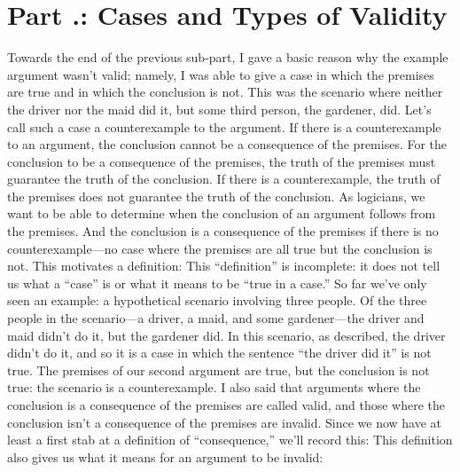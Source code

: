 \section{Part \thechapcount.\theseccount: Cases and Types of Validity}
Towards the end of the previous sub-part, I gave a basic reason why the example argument wasn't valid; namely, I was able to give a case in which the premises are true and in which the conclusion is not. This was the scenario where neither the driver nor the maid did it, but some third person, the gardener, did. Let’s call such a case a counterexample to the argument. If there is a counterexample to an argument, the conclusion cannot be a consequence of the premises. For the conclusion to be a consequence of the premises, the truth of the premises must guarantee the truth of the conclusion. If there is a counterexample, the truth of the premises does not guarantee the truth of the conclusion. As logicians, we want to be able to determine when the conclusion of an argument follows from the premises. And the conclusion is a consequence of the premises if there is no counterexample—no case where the premises are all true but the conclusion is not. This motivates a definition:
This “definition” is incomplete: it does not tell us what a “case” is or what it means to be “true in a case.” So far we’ve only seen an example: a hypothetical scenario involving three people. Of the three people in the scenario—a driver, a maid, and some gardener—the driver and maid didn’t do it, but the gardener did. In this scenario, as described, the driver didn’t do it, and so it is a case in which the sentence “the driver did it” is not true. The premises of our second argument are true, but the conclusion is not true: the scenario is a counterexample. I also said that arguments where the conclusion is a consequence of the premises are called valid, and those where the conclusion isn’t a consequence of the premises are \gls{invalid}. Since we now have at least a first stab at a definition of “consequence,” we’ll record this:
This definition also gives us what it means for an argument to be invalid:
